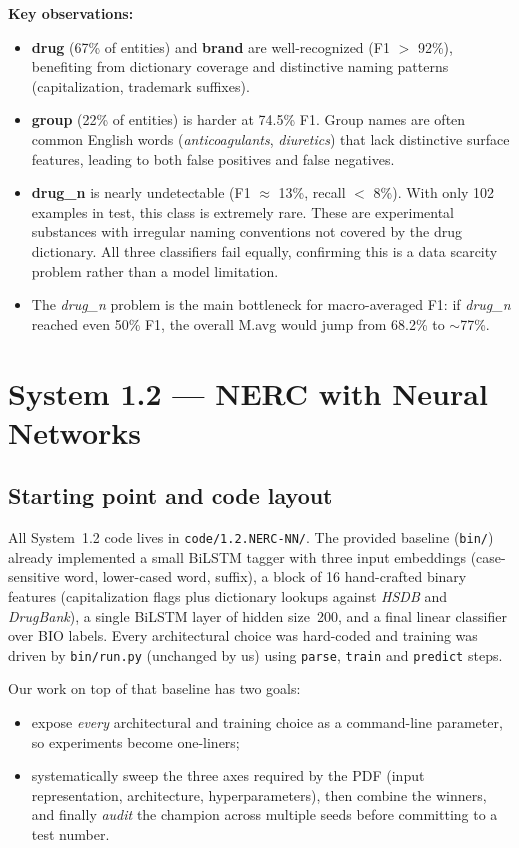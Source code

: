 \documentclass[a4paper,12pt]{article}
\newcommand{\callout}[1]{\textbf{\textcolor{tabgreen}{#1}}}
\begin{document}
\callout{Key observations:}
\begin{itemize}[nosep]
    \item \textbf{drug} (67\% of entities) and \textbf{brand} are well-recognized (F1 $>$ 92\%), benefiting from dictionary coverage and distinctive naming patterns (capitalization, trademark suffixes).
    \item \textbf{group} (22\% of entities) is harder at 74.5\% F1. Group names are often common English words (\textit{anticoagulants}, \textit{diuretics}) that lack distinctive surface features, leading to both false positives and false negatives.
    \item \textbf{drug\_n} is nearly undetectable (F1 $\approx$ 13\%, recall $<$ 8\%). With only 102 examples in test, this class is extremely rare. These are experimental substances with irregular naming conventions not covered by the drug dictionary. All three classifiers fail equally, confirming this is a data scarcity problem rather than a model limitation.
    \item The \textit{drug\_n} problem is the main bottleneck for macro-averaged F1: if \textit{drug\_n} reached even 50\% F1, the overall M.avg would jump from 68.2\% to $\sim$77\%.
\end{itemize}

\section{System 1.2 — NERC with Neural Networks}

\subsection{Starting point and code layout}
All System~1.2 code lives in \texttt{code/1.2.NERC-NN/}. The provided
baseline (\texttt{bin/}) already implemented a small BiLSTM tagger with
three input embeddings (case-sensitive word, lower-cased word, suffix),
a block of 16 hand-crafted binary features (capitalization flags plus
dictionary lookups against \textit{HSDB} and \textit{DrugBank}), a single
BiLSTM layer of hidden size~200, and a final linear classifier over BIO
labels. Every architectural choice was hard-coded and training was
driven by \texttt{bin/run.py} (unchanged by us) using \texttt{parse},
\texttt{train} and \texttt{predict} steps.

Our work on top of that baseline has two goals:
\begin{itemize}[nosep]
    \item expose \emph{every} architectural and training choice as a
          command-line parameter, so experiments become one-liners;
    \item systematically sweep the three axes required by the PDF
          (input representation, architecture, hyperparameters),
          then combine the winners, and finally \emph{audit} the
          champion across multiple seeds before committing to a test
          number.
\end{itemize}
\end{document}
